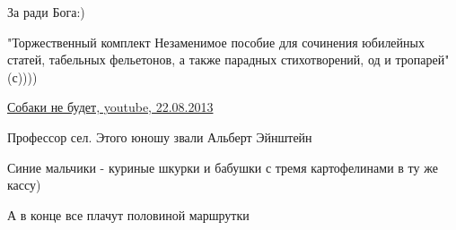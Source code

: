 \begin{itemize}
\begin{itemize}
 
За ради Бога:)
\end{itemize}

 
"Торжественный комплект
Незаменимое пособие для сочинения юбилейных статей, табельных фельетонов, а также парадных стихотворений, од и тропарей" (с))))

 
\href{https://www.youtube.com/watch?v=bwEjg6mWjHc}{%
Собаки не будет, youtube, 22.08.2013%
}

 
Профессор сел. Этого юношу звали Альберт Эйнштейн

 
Синие мальчики - куриные шкурки и бабушки с тремя картофелинами в ту же кассу)

\begin{itemize}
 
А в конце все плачут половиной маршрутки


\end{itemize}
\end{itemize}
